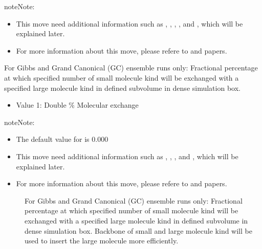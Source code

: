 \documentclass[letterpaper,10pt,english]{sphinxmanual}
\begin{document}
\begin{description}
\begin{sphinxadmonition}{note}{Note:}
\begin{itemize}
\item {} 
This move need additional information such as , , , , and , which will be explained later.

\item {} 
For more information about this move, please refere to  and  papers.

\end{itemize}
\end{sphinxadmonition}

\item[{\sphinxcode{\sphinxupquote{MEMC\sphinxhyphen{}1Freq}}}] \leavevmode
For Gibbs and Grand Canonical (GC) ensemble runs only: Fractional percentage at which specified number of small molecule kind will be exchanged with a specified large molecule kind in defined sub\sphinxhyphen{}volume in dense simulation box.
\begin{itemize}
\item {} 
Value 1: Double \sphinxhyphen{} \% Molecular exchange

\end{itemize}

\begin{sphinxadmonition}{note}{Note:}\begin{itemize}
\item {} 
The default value for  is 0.000

\item {} 
This move need additional information such as , , , and , which will be explained later.

\item {} 
For more information about this move, please refere to  and  papers.

\end{itemize}
\end{sphinxadmonition}
\begin{description}
\item[{}] \leavevmode
For Gibbs and Grand Canonical (GC) ensemble runs only: Fractional percentage at which specified number of small molecule kind will be exchanged with a specified large molecule kind in defined sub\sphinxhyphen{}volume in dense simulation box. Backbone of small and large molecule kind will be used to insert the large molecule more efficiently.


\end{description}
\end{description}
\end{document}
